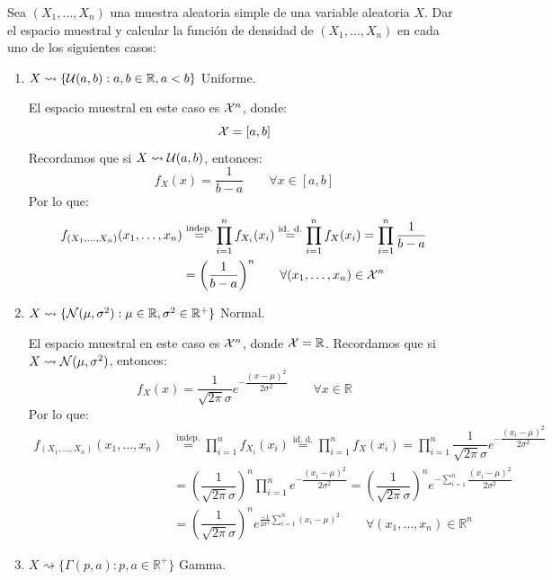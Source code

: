 \begin{ejercicio}
    Sea $(X_1, \ldots, X_n)$ una muestra aleatoria simple de una variable aleatoria $X$. Dar el espacio muestral y calcular la función de densidad de $(X_1, \ldots, X_n)$ en cada uno de los siguientes casos:
    \begin{enumerate}[label=\alph*)]
        \item $X\rightsquigarrow\{\mathcal{U}(a,b) : a,b\in \mathbb{R}, a<b\}$ Uniforme.

            El espacio muestral en este caso es $\mathcal{X}^n$, donde:
            \begin{equation*}
                \mathcal{X} = [a,b]
            \end{equation*}
            Recordamos que si $X\rightsquigarrow \mathcal{U}(a,b)$, entonces:
            \begin{equation*}
                f_X(x) = \dfrac{1}{b-a} \qquad \forall x\in [a,b]
            \end{equation*}
            Por lo que:
            \begin{align*}
                f_{(X_1, \ldots, X_n)}(x_1, \ldots, x_n) &\stackrel{\text{indep.}}{=} \prod_{i=1}^{n} f_{X_i}(x_i) \stackrel{\text{id. d.}}{=} \prod_{i=1}^{n} f_X(x_i) = \prod_{i=1}^{n} \dfrac{1}{b-a} \\ &= {\left(\dfrac{1}{b-a}\right)}^{n} \qquad \forall (x_1, \ldots, x_n) \in \mathcal{X}^n
            \end{align*}

        \item $X\rightsquigarrow\{\mathcal{N}(\mu, \sigma^2) : \mu \in \mathbb{R}, \sigma^2 \in \mathbb{R}^+\}$ Normal.

            El espacio muestral en este caso es $\mathcal{X}^n$, donde $\mathcal{X} = \mathbb{R}$. Recordamos que si $X\rightsquigarrow \mathcal{N}(\mu, \sigma^2)$, entonces:
            \begin{equation*}
                f_X(x) = \dfrac{1}{\sqrt{2\pi} \sigma} e^{-\dfrac{{(x-\mu)}^{2}}{2\sigma^2}} \qquad \forall x\in \mathbb{R}
            \end{equation*}
            Por lo que:
            \begin{align*}
                f_{(X_1, \ldots, X_n)}(x_1, \ldots, x_n) &\stackrel{\text{indep.}}{=} \prod_{i=1}^{n} f_{X_i}(x_i) \stackrel{\text{id. d.}}{=} \prod_{i=1}^{n} f_X(x_i) 
                = \prod_{i=1}^{n} \dfrac{1}{\sqrt{2\pi} \sigma} e^{-\dfrac{{(x_i-\mu)}^{2}}{2\sigma^2}}  \\
                &= {\left(\dfrac{1}{\sqrt{2\pi}\sigma}\right)}^{n} \prod_{i=1}^{n} e^{-\dfrac{{(x_i-\mu)}^{2}}{2\sigma^2}}  = {\left(\dfrac{1}{\sqrt{2\pi}\sigma}\right)}^{n} e^{-\sum\limits_{i=1}^n\dfrac{{(x_i-\mu)}^{2}}{2\sigma^2}}   \\
                &= {\left(\dfrac{1}{\sqrt{2\pi}\sigma}\right)}^{n} e^{\frac{-1}{2\sigma^2}\sum\limits_{i=1}^n {(x_i-\mu)}^{2}} \qquad \forall (x_1,\ldots,x_n) \in \mathbb{R}^n
            \end{align*}
        \item $X\rightsquigarrow\{\Gamma(p,a) : p,a\in \mathbb{R}^+\}$ Gamma.


\end{enumerate}
\end{ejercicio}
